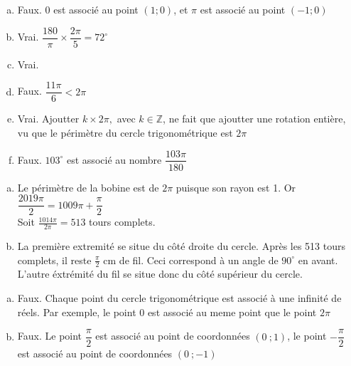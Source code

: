 \documentclass[12pt, a4paper]{article}
\begin{document}
\begin{Exercise}[number={47}]
    \begin{enumerate}[a)]
        \item Faux. 0 est associé au point $(1;0)$, et $\pi$ est associé au point $(-1;0)$
        \item Vrai. $\dfrac{180}{\pi}\times\dfrac{2\pi}{5}=72^{\circ}$
        \item Vrai.
        \item Faux. $\dfrac{11\pi}{6}<2\pi$
        \item Vrai. Ajoutter $k\times2\pi,$ avec $k\in \mathbb{Z}$, ne fait que ajoutter une rotation entière, vu que le périmètre du cercle trigonométrique est $2\pi$
        \item Faux. $103^{\circ}$ est associé au nombre $\dfrac{103\pi}{180}$
    \end{enumerate}
\end{Exercise}

\begin{Exercise}[number={50}]
    \begin{enumerate}[a)]
        \item Le périmètre de la bobine est de $2\pi$ puisque son rayon est 1. Or $\dfrac{2019\pi}{2}=1009\pi+\dfrac{\pi}{2}$ \\ Soit $\frac{1014\pi}{2\pi}=513$ tours complets.
        \item La première extremité se situe du côté droite du cercle. Après les 513 tours complets, il reste $\frac{\pi}{2}$ cm de fil. Ceci correspond à un angle de $90^{\circ}$ en avant. L'autre éxtrémité du fil se situe donc du côté supérieur du cercle.
    \end{enumerate}
\end{Exercise}

\begin{Exercise}[number={52}]
    \begin{enumerate}[a)]
        \item Faux. Chaque point du cercle trigonométrique est associé à une infinité de réels. Par exemple, le point 0 est associé au meme point que le point $2\pi$
        \item Faux. Le point $\dfrac{\pi}{2}$ est associé au point de coordonnées $(0\ ;1)$, le point $-\dfrac{\pi}{2}$ est associé au point de coordonnées $(0\ ;-1)$
    \end{enumerate}
\end{Exercise}
\end{document}
